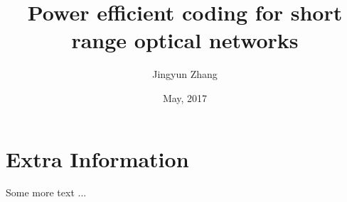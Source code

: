 \documentclass[withindex,glossary]{cam-thesis}
\title{Power efficient coding for short range optical networks}
\author{Jingyun Zhang}
\date{May, 2017}
\begin{document}
\frontmatter{}









\cleardoublepage
{}
{}






\appendix

\chapter{Extra Information}
Some more text ...



\printthesisindex
\end{document}
